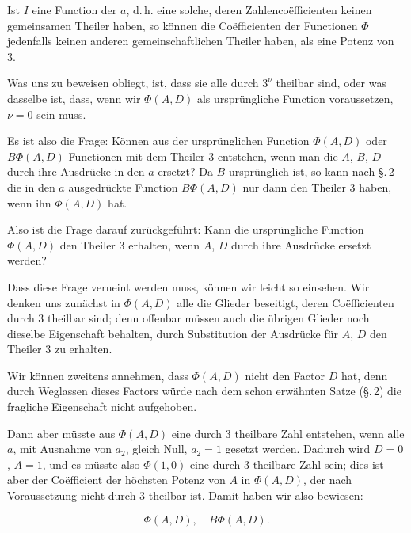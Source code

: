 Ist $I$ eine  Function der $a$, d.\,h. eine solche,
deren Zahlenco\"efficienten keinen gemeinsamen Theiler haben, so können die
Co\"efficienten der Functionen $\Phi$ jedenfalls keinen anderen
gemeinschaftlichen Theiler haben, als eine Potenz von 3.

Was uns zu beweisen obliegt, ist, dass sie alle durch $3^\nu$ theilbar sind,
oder was dasselbe ist, dass, wenn wir $\Phi(A, D)$ als ursprüngliche Function
voraussetzen, $\nu = 0$ sein muss.

Es ist also die Frage: Können aus der ursprünglichen Function $\Phi(A, D)$
oder $B\Phi(A, D)$ Functionen mit dem Theiler 3 entstehen, wenn man die $A$,
$B$, $D$ durch ihre Ausdrücke in den $a$ ersetzt? Da $B$ ursprünglich ist, so
kann nach \S.\,2 die in den $a$ ausgedrückte Function $B\Phi(A, D)$ nur dann
den Theiler 3 haben, wenn ihn $\Phi(A, D)$ hat.

Also ist die Frage darauf zurückgeführt: Kann die ursprüngliche Function
$\Phi(A, D)$ den Theiler 3 erhalten, wenn $A$, $D$ durch ihre Ausdrücke
ersetzt werden?

Dass diese Frage verneint werden muss, können wir leicht so einsehen. Wir
denken uns zunächst in $\Phi(A, D)$ alle die Glieder beseitigt, deren
Co\"efficienten durch 3 theilbar sind; denn offenbar müssen auch die übrigen
Glieder noch dieselbe Eigenschaft behalten, durch Substitution der Ausdrücke
für $A$, $D$ den Theiler 3 zu erhalten.

Wir können zweitens annehmen, dass $\Phi(A, D)$ nicht den Factor $D$ hat,
denn durch Weglassen dieses Factors würde nach dem schon erwähnten Satze
(\S.\,2) die fragliche Eigenschaft nicht aufgehoben.

Dann aber müsste aus $\Phi(A, D)$ eine durch 3 theilbare Zahl entstehen, wenn
alle $a$, mit Ausnahme von $a_2$, gleich Null, $a_2 = 1$ gesetzt werden.
Dadurch wird $D = 0$, $A = 1$, und es müsste also $\Phi(1, 0)$ eine durch 3
theilbare Zahl sein; dies ist aber der Co\"efficient der höchsten Potenz von
$A$ in $\Phi(A, D)$, der nach Voraussetzung nicht durch 3 theilbar ist.
Damit haben wir also bewiesen:

\[
\Phi(A, D), \quad B\Phi(A, D).
\]
